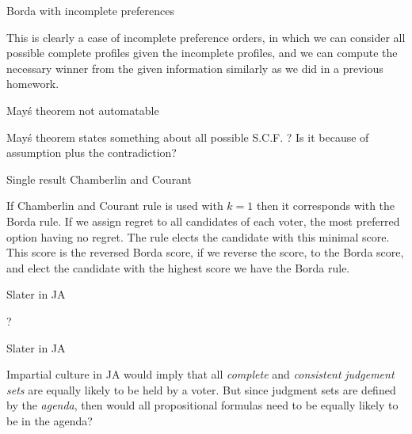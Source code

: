 \documentclass[12pt]{article}
\newenvironment{question}[2][Question]{\begin{trivlist}
\item[\hskip \labelsep {\bfseries #1}\hskip \labelsep {\bfseries #2.}]}{\end{trivlist}}
\newenvironment{answer}[2][Answer]{\begin{trivlist}
\item[\hskip \labelsep {\bfseries #1}\hskip \labelsep {\bfseries #2:}]}{\end{trivlist}}
\begin{document}
\begin{question}{2}{}


\end{question}
\begin{answer}{a)}{Borda with incomplete preferences}

This is clearly a case of incomplete preference orders, in which we can consider all possible complete profiles given the incomplete profiles, and we can compute the necessary winner from the given information similarly as we did in a previous homework.
\end{answer}
\begin{answer}{b)}{May\'s theorem not automatable}

May\'s theorem states something about all possible S.C.F. ? Is it because of assumption plus the contradiction?
\end{answer}
\begin{answer}{c)}{Single result Chamberlin and Courant}

If Chamberlin and Courant rule is used with $k=1$ then it corresponds with the Borda rule. If we assign regret to all candidates of each voter, the most preferred option having no regret. The rule elects the candidate with this minimal score. This score is the reversed Borda score, if we reverse the score, to the Borda score, and elect the candidate with the highest score we have the Borda rule.
\end{answer}
\begin{answer}{d)}{Slater in JA}

?
\end{answer}
\begin{answer}{e)}{Slater in JA}

Impartial culture in JA would imply that all \textit{complete} and \textit{consistent} \textit{judgement sets} are equally likely to be held by a voter. But since judgment sets are defined by the \textit{agenda}, then would all propositional formulas need to be equally likely to be in the agenda?
\end{answer}
\end{document}
